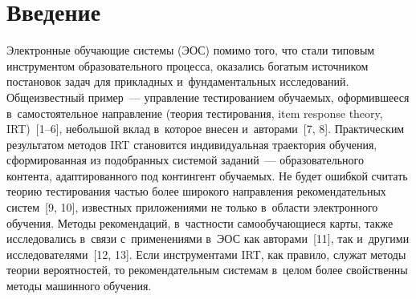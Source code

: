 
  
\vspace*{-3pt}



\thispagestyle{headings}

\begin{multicols}{2}

\label{st\stat}
  
\section{Введение}


  Электронные обучающие системы (ЭОС) по\-мимо того, что стали типовым 
инструментом обра\-зовательного процесса, оказались богатым источником 
постановок задач для прикладных и~\mbox{фундаментальных} исследований. 
Общеизвестный пример~--- управ\-ле\-ние тестированием обуча\-емых, 
оформившееся в~самостоятельное на\-прав\-ле\-ние (тео\-рия тес\-ти\-ро\-ва\-ния, item 
response theory, IRT)~[1--6], небольшой вклад в~которое внесен и~авторами~[7, 8]. Практическим результатом методов IRT становится 
индивидуальная траектория обуче\-ния, сформированная из подобранных 
системой заданий~--- образовательного контента, адап\-ти\-ро\-ван\-но\-го под 
контингент обучаемых. Не будет ошибкой считать тео\-рию тес\-ти\-ро\-ва\-ния 
частью более широкого на\-прав\-ле\-ния рекомендательных сис\-тем~[9, 10], 
известных приложениями не только в~об\-ласти электронного обуче\-ния. 
Методы рекомендаций, в~част\-ности са\-мо\-обуча\-ющи\-еся карты, так\-же 
исследовались в~связи с~применениями в~ЭОС как авторами~[11], так 
и~другими исследователями~[12, 13]. Если инструментами IRT, как правило, 
служат методы тео\-рии вероятностей, то рекомендательным сис\-те\-мам в~целом 
более свойственны методы машинного обуче\-ния.

\begin{figure*}[b] %
   \vspace*{1pt}
      \begin{center}
     \mbox{%
\epsfxsize=158.467mm 
}
\end{center}
\vspace*{-9pt}
  \end{figure*}
  

\end{multicols}
